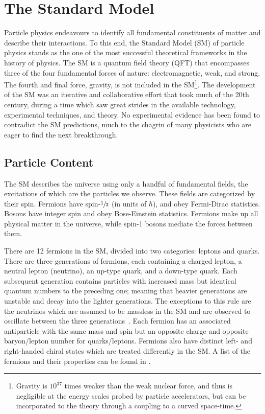 \chapter{The Standard Model}
\label{ch:sm}

Particle physics endeavours to identify all fundamental constituents of matter and describe their interactions.
To this end, the Standard Model (SM) of particle physics stands as the one of the most successful theoretical frameworks in the history of physics.
The SM is a quantum field theory (QFT) that encompasses three of the four fundamental forces of nature: electromagnetic, weak, and strong.
The fourth and final force, gravity, is not included in the SM\footnote{Gravity is $10^{37}$ times weaker than the weak nuclear force, and thus is negligible at the energy scales probed by particle accelerators, but can be incorporated to the theory through a coupling to a curved space-time.}.
The development of the SM was an iterative and collaborative effort that took much of the 20th century, during a time which saw great strides in the available technology, experimental techniques, and theory.
No experimental evidence has been found to contradict the SM predictions, much to the chagrin of many physicists who are eager to find the next breakthrough.

\section{Particle Content}

The SM describes the universe using only a handful of fundamental fields, the excitations of which are the particles we observe.
These fields are categorized by their spin.
Fermions have spin-$\sfrac{1}{2}$ (in units of $\hbar$), and obey Fermi-Dirac statistics.
Bosons have integer spin and obey Bose-Einstein statistics.
Fermions make up all physical matter in the universe, while spin-1 bosons mediate the forces between them.

There are 12 fermions in the SM, divided into two categories: leptons and quarks.
There are three generations of fermions, each containing a charged lepton, a neutral lepton (neutrino), an up-type quark, and a down-type quark.
Each subsequent generation contains particles with increased mass but identical quantum numbers to the preceding one; meaning that heavier generations are unstable and decay into the lighter generations.
The exceptions to this rule are the neutrinos which are assumed to be massless in the SM and are observed to oscillate between the three generations~\cite{SearchNeutrinosSun, NeutrinoOsc}.
Each fermion has an associated antiparticle with the same mass and spin but an opposite charge and opposite baryon/lepton number for quarks/leptons.
Fermions also have distinct left- and right-handed chiral states which are treated differently in the SM\@.
A list of the fermions and their properties can be found in .

